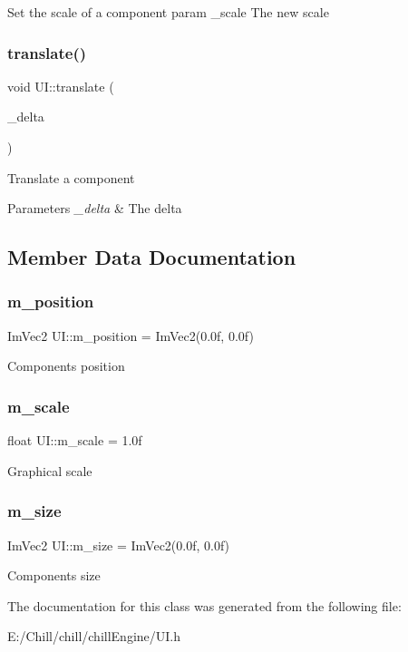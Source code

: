 Set the scale of a component param \+\_\+scale The new scale \mbox{\label{class_u_i_a45f75304b2c3fbea67c846709a5fc3d6}} 
\subsubsection{\texorpdfstring{translate()}{translate()}}
{\footnotesize\ttfamily void U\+I\+::translate (\begin{DoxyParamCaption}\item[{Im\+Vec2}]{\+\_\+delta }\end{DoxyParamCaption})\hspace{0.3cm}{\ttfamily [inline]}}

Translate a component 
\begin{DoxyParams}{Parameters}
{\em \+\_\+delta} & The delta \\
\hline
\end{DoxyParams}


\subsection{Member Data Documentation}
\mbox{\label{class_u_i_ad2489ec467f98fb8efa04e1724ff8bc8}} 
\subsubsection{\texorpdfstring{m\+\_\+position}{m\_position}}
{\footnotesize\ttfamily Im\+Vec2 U\+I\+::m\+\_\+position = Im\+Vec2(0.\+0f, 0.\+0f)}

Component\textquotesingle{}s position \mbox{\label{class_u_i_a9a7264d8fcbead94498e2723204f0b63}} 
\subsubsection{\texorpdfstring{m\+\_\+scale}{m\_scale}}
{\footnotesize\ttfamily float U\+I\+::m\+\_\+scale = 1.\+0f}

Graphical scale \mbox{\label{class_u_i_a15b42e4e8dfa93817e613ea089d0dfec}} 
\subsubsection{\texorpdfstring{m\+\_\+size}{m\_size}}
{\footnotesize\ttfamily Im\+Vec2 U\+I\+::m\+\_\+size = Im\+Vec2(0.\+0f, 0.\+0f)}

Component\textquotesingle{}s size 

The documentation for this class was generated from the following file\+:\begin{DoxyCompactItemize}
\item 
E\+:/\+Chill/chill/chill\+Engine/U\+I.\+h\end{DoxyCompactItemize}
